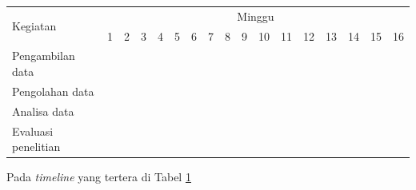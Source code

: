 \newcommand{\w}{}
\newcommand{\G}{\cellcolor{gray}}
\begin{table}[H]
  \label{tbl:timeline}
  \begin{tabular}{|p{3.5cm}|c|c|c|c|c|c|c|c|c|c|c|c |c|c|c|c|}

    \hline
    \multirow{2}{*}{Kegiatan} & \multicolumn{16}{|c|}{Minggu}                                                                       \\
    \cline{2-17}              &
    1                         & 2                             & 3  & 4  & 5  & 6  & 7  & 8  & 9  & 10 & 11 & 12 & 13 & 14 & 15 & 16 \\
    \hline

    Pengambilan data          &
    \G                        & \G                            & \G & \G & \w & \w & \w & \w & \w & \w & \w & \w & \w & \w & \w & \w \\
    \hline

    Pengolahan data           &
    \w                        & \w                            & \w & \w & \G & \G & \G & \G & \w & \w & \w & \w & \w & \w & \w & \w \\
    \hline

    Analisa data              &
    \w                        & \w                            & \w & \w & \w & \w & \w & \w & \G & \G & \G & \G & \w & \w & \w & \w \\
    \hline

    Evaluasi penelitian       &
    \w                        & \w                            & \w & \w & \w & \w & \w & \w & \w & \w & \w & \w & \G & \G & \G & \G \\
    \hline
  \end{tabular}
\end{table}

Pada \emph{timeline} yang tertera di Tabel \ref{tbl:timeline} \lipsum[10]

